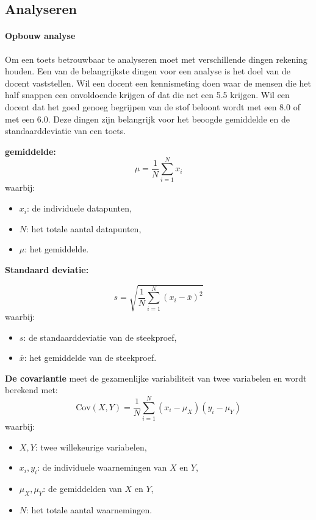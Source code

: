 \documentclass[12pt]{article}
\begin{document}
\pagebreak
\subsection{Analyseren}
\begin{multicols}{2}
\paragraph*{Opbouw analyse} Om een toets betrouwbaar te analyseren moet met verschillende dingen rekening houden. Een van de belangrijkste dingen voor een analyse is het doel van de docent vaststellen. Wil een docent een kennismeting doen waar de mensen die het half snappen een onvoldoende krijgen of dat die net een 5.5 krijgen. Wil een docent dat het goed genoeg begrijpen van de stof beloont wordt met een 8.0 of met een 6.0. Deze dingen zijn belangrijk voor het beoogde gemiddelde en de standaarddeviatie van een toets.
\begin{minipage}{1\linewidth}
    
\textbf{gemiddelde: }
\[
\mu = \frac{1}{N} \sum_{i=1}^N x_i
\]
waarbij:
\begin{itemize}
    \item \( x_i \): de individuele datapunten,
    \item \( N \): het totale aantal datapunten,
    \item \( \mu \): het gemiddelde.
\end{itemize}
\end{minipage}
\begin{minipage}{\linewidth}
\textbf{Standaard deviatie: }

\[
s = \sqrt{\frac{1}{N} \sum_{i=1}^N (x_i - \bar{x})^2}
\]
waarbij:
\begin{itemize}
    \item \( s \): de standaarddeviatie van de steekproef,
    \item \( \bar{x} \): het gemiddelde van de steekproef.
\end{itemize}
\end{minipage}
\begin{minipage}{\linewidth}
\textbf{De covariantie} meet de gezamenlijke variabiliteit van twee variabelen en wordt berekend met:
\[
\text{Cov}(X, Y) = \frac{1}{N} \sum_{i=1}^N (x_i - \mu_X)(y_i - \mu_Y)
\]
waarbij:
\begin{itemize}
    \item \(X, Y\): twee willekeurige variabelen,
    \item \(x_i, y_i\): de individuele waarnemingen van \(X\) en \(Y\),
    \item \(\mu_X, \mu_Y\): de gemiddelden van \(X\) en \(Y\),
    \item \(N\): het totale aantal waarnemingen.
\end{itemize}
\end{minipage}
\end{multicols}
\vspace{3em}
\end{document}
